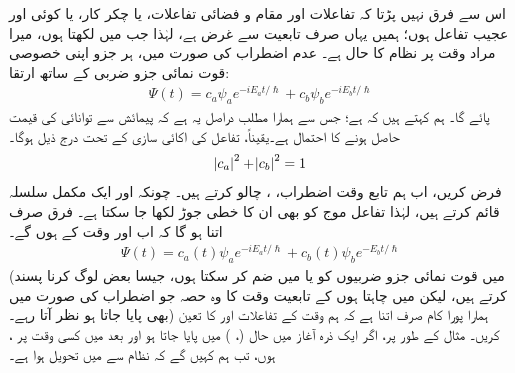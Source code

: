 اس سے فرق نہیں پڑتا کہ تفاعلات  اور  مقام و فضائی تفاعلات، یا چکر کار، یا کوئی اور عجیب تفاعل ہوں؛ ہمیں یہاں صرف تابعیت  سے غرض ہے، لہٰذا جب میں  لکھتا ہوں، میرا مراد وقت  پر نظام کا حال ہے۔ عدم اضطراب کی صورت میں، ہر جزو اپنی خصوصی قوت نمائی جزو ضربی کے ساتھ ارتقا:
\begin{align}
	\Psi(t)=c_a\psi_ae^{-iE_at/\hslash}+c_b\psi_be^{-iE_bt/\hslash}
\end{align}
پائے گا۔ ہم کہتے ہیں کہ   ہے؛ جس سے ہمارا مطلب دراصل یہ ہے کہ پیمائش سے توانائی کی قیمت  حاصل ہونے کا احتمال  ہے۔یقیناً، تفاعل  کی اکائی سازی کے تحت درج ذیل ہوگا۔
\begin{align}\label{مساوات_تابع_مضطرب_معمول_زنی}
	\abs{c_a}^2+\abs{c_b}^2=1
\end{align}
 فرض کریں، اب ہم تابع وقت اضطراب، ، چالو کرتے ہیں۔ چونکہ  اور  ایک مکمل سلسلہ قائم کرتے ہیں، لہٰذا تفاعل موج  کو بھی ان کا خطی جوڑ لکھا جا سکتا ہے۔ فرق صرف اتنا ہو گا کہ اب  اور  وقت  کے  ہوں گے۔
\begin{align}\label{مساوات_تابع_مضطرب_وقت}
	\Psi(t)=c_a(t)\psi_ae^{-iE_at/\hslash}+c_b(t)\psi_be^{-E_bt/\hslash}
\end{align}
(میں قوت نمائی جزو ضربیوں کو  یا  میں ضم کر سکتا ہوں، جیسا بعض لوگ کرنا پسند کرتے ہیں، لیکن میں چاہتا ہوں کے تابعیت وقت کا وہ حصہ جو  اضطراب کی صورت میں بھی پایا جاتا ہو نظر آتا رہے۔) ہمارا پورا کام صرف اتنا ہے کہ ہم وقت کے تفاعلات  اور  کا تعین کریں۔ مثال کے طور پر، اگر ایک ذرہ آغاز میں حال  
(، ) میں پایا جاتا ہو اور بعد میں کسی وقت  پر ،  ہوں، تب ہم کہیں گے کہ نظام  سے  میں تحویل ہوا ہے۔

